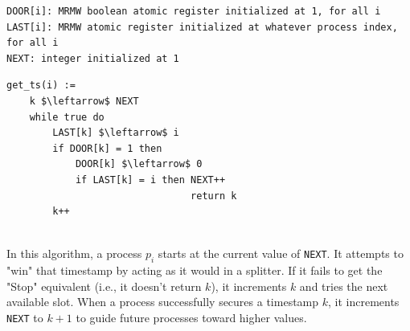 \begin{minipage}{\textwidth}
\begin{lstlisting}[mathescape]
DOOR[i]: MRMW boolean atomic register initialized at 1, for all i
LAST[i]: MRMW atomic register initialized at whatever process index, for all i
NEXT: integer initialized at 1
\end{lstlisting}
\begin{lstlisting}[mathescape]
get_ts(i) :=
    k $\leftarrow$ NEXT
    while true do
        LAST[k] $\leftarrow$ i
        if DOOR[k] = 1 then
            DOOR[k] $\leftarrow$ 0
            if LAST[k] = i then NEXT++
                                return k
        k++
\end{lstlisting}
\end{minipage}\\

In this algorithm, a process $p_i$ starts at the current value of \texttt{NEXT}. It attempts to "win" that timestamp by acting as it would in a splitter. If it fails to get the "Stop" equivalent (i.e., it doesn't return $k$), it increments $k$ and tries the next available slot. When a process successfully secures a timestamp $k$, it increments \texttt{NEXT} to $k+1$ to guide future processes toward higher values.

